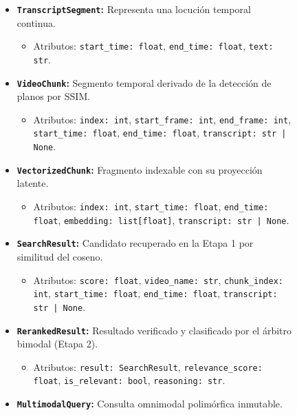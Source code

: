 \begin{figure}[htbp]
\centering
\small
\begin{tcolorbox}[colback=white,colframe=gray!50,arc=2mm,title={\bfseries Estructura del Modelo de Dominio Inmutable}]
\begin{itemize}[leftmargin=1.5em]
    \item \textbf{\texttt{TranscriptSegment}:} Representa una locución temporal continua.
    \begin{itemize}
        \item Atributos: \texttt{start\_time: float}, \texttt{end\_time: float}, \texttt{text: str}.
    \end{itemize}
    \item \textbf{\texttt{VideoChunk}:} Segmento temporal derivado de la detección de planos por SSIM.
    \begin{itemize}
        \item Atributos: \texttt{index: int}, \texttt{start\_frame: int}, \texttt{end\_frame: int}, \texttt{start\_time: float}, \texttt{end\_time: float}, \texttt{transcript: str | None}.
    \end{itemize}
    \item \textbf{\texttt{VectorizedChunk}:} Fragmento indexable con su proyección latente.
    \begin{itemize}
        \item Atributos: \texttt{index: int}, \texttt{start\_time: float}, \texttt{end\_time: float}, \texttt{embedding: list[float]}, \texttt{transcript: str | None}.
    \end{itemize}
    \item \textbf{\texttt{SearchResult}:} Candidato recuperado en la Etapa 1 por similitud del coseno.
    \begin{itemize}
        \item Atributos: \texttt{score: float}, \texttt{video\_name: str}, \texttt{chunk\_index: int}, \texttt{start\_time: float}, \texttt{end\_time: float}, \texttt{transcript: str | None}.
    \end{itemize}
    \item \textbf{\texttt{RerankedResult}:} Resultado verificado y clasificado por el árbitro bimodal (Etapa 2).
    \begin{itemize}
        \item Atributos: \texttt{result: SearchResult}, \texttt{relevance\_score: float}, \texttt{is\_relevant: bool}, \texttt{reasoning: str}.
    \end{itemize}
    \item \textbf{\texttt{MultimodalQuery}:} Consulta omnimodal polimórfica inmutable.

\end{itemize}
\end{tcolorbox}
\end{figure}
